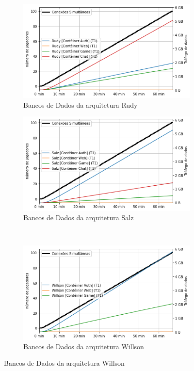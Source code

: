 \begin{figure}[htb!]
    \caption{Entrada de dados da rede das arquiteturas}
    \label{fig:experimento_gs_net_in}

    \begin{subfigure}{0.5\textwidth}
        \centering
        \includegraphics[width=.95\linewidth]{figuras/analise/rt/r_net_in_arch.png}
        \caption{Bancos de Dados da arquitetura Rudy}
        \label{fig:r_netin_gs}
    \end{subfigure}%
    \begin{subfigure}{0.5\textwidth}
        \centering
        \includegraphics[width=.95\linewidth]{figuras/analise/rt/s_net_in_arch.png}
        \caption{Bancos de Dados da arquitetura Salz}
        \label{fig:s_netin_gs}
    \end{subfigure}\\

    \begin{subfigure}{0.5\textwidth}
        \centering
        \includegraphics[width=.95\linewidth]{figuras/analise/rt/w_net_in_arch.png}
        \caption{Bancos de Dados da arquitetura Willson}
        \label{fig:w_netin_gs}
    \end{subfigure}


\end{figure}
